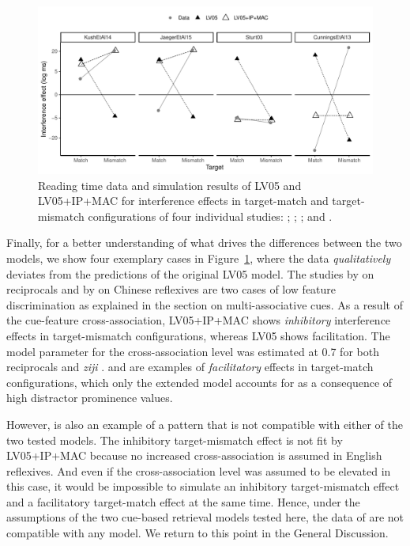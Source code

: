 \documentclass{cambridge7A}\usepackage[]{graphicx}\usepackage[]{color}
\newcommand{\revised}[1]{#1}
\begin{document}
\begin{figure}[htbp]
\centering
\includegraphics[width=\textwidth]{figures/fig-simresultsSlct}

%
  \caption{Reading time data and simulation results of LV05 and LV05+IP+MAC for interference effects in target-match and target-mismatch configurations of four individual studies: \cite{KushPhillips2014}; \cite[][Exp.\ 1]{JaegerEngelmannVasishth2015}; \cite[][Exp.\ 1]{Sturt2003}; and \cite[][Exp.\ 2, participants with low working memory]{CunningsFelser2013}.
  }
  \label{fig:simresultsSlct} 
\end{figure}
%

Finally, for a better understanding of what drives the differences between the two models, we show four exemplary cases in Figure~\ref{fig:simresultsSlct}, where the data \emph{qualitatively} deviates from the predictions of the original LV05 model. 
The studies by \cite{KushPhillips2014} on reciprocals and by \cite{JaegerEngelmannVasishth2015} on Chinese reflexives are two cases of low feature discrimination as explained in the section on multi-associative cues. As a result of the cue-feature cross-association, LV05+IP+MAC shows \emph{inhibitory} interference effects in target-mismatch configurations, whereas LV05 shows facilitation. 
The model parameter for the cross-association level was estimated at 0.7 for both reciprocals \citep{KushPhillips2014} and 
\textit{ziji} \citep{JaegerEngelmannVasishth2015}.
\cite{CunningsFelser2013} and \cite{Sturt2003} are examples of \emph{facilitatory} effects in target-match configurations, which only the extended model accounts for as a consequence of high distractor prominence values.

However, \cite{CunningsFelser2013} is also an example of a pattern that is not compatible with \revised{either} of the two tested models. The inhibitory target-mismatch effect is not fit by LV05+IP+MAC because no increased cross-association is assumed in English reflexives. And even if the cross-association level was assumed to be elevated in this case, it would be impossible to simulate an inhibitory target-mismatch effect and a facilitatory target-match effect at the same time. 
Hence, under the assumptions of the two cue-based retrieval models tested here, the data of \cite{CunningsFelser2013} are not compatible with any model. We return to this point in the General Discussion.
\end{document}
